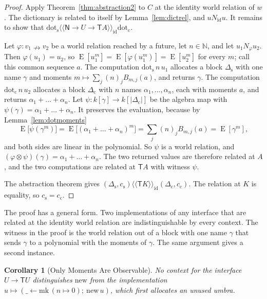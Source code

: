 \documentclass[11pt,a4paper]{report}
\theoremstyle{plain}
\newtheorem{corollary}[theorem]{Corollary}
\theoremstyle{definition}
\theoremstyle{remark}
\newcommand{\E}{\operatorname{E}}
\newcommand{\NN}{\mathbb{N}}
\newcommand{\T}{\mathsf{T}}
\newcommand{\Nat}{\mathsf{N}}
\newcommand{\mk}{\mathrm{mk}}
\newcommand{\rel}[2]{\langle\!\langle #1 \rangle\!\rangle_{#2}}
\begin{document}
\begin{proof}
Apply Theorem~\ref{thm:abstraction2} to $C$ at the identity world relation of $w$.
The dictionary is related to itself by Lemma~\ref{lem:dictrel}, and
$u \mathrel{N_{\mathrm{id}}} u$. It remains to show that
$\mathrm{dot}_{\mathrm{s}} \mathrel{\rel{\Nat \to U \to \T A}{\mathrm{id}}}
\mathrm{dot}_{\mathrm{c}}$.

Let $\varphi : v_1 \nrightarrow v_2$ be a world relation reached by a future, let
$n \in \NN$, and let $u_1 \mathrel{N_\varphi} u_2$. Then $\varphi(u_1) = u_2$, so
$\E[u_1^m] = \E[\varphi(u_1^m)] = \E[u_2^m]$ for every $m$; call this common
sequence $a$. The computation $\mathrm{dot}_{\mathrm{s}}\, n\, u_1$ allocates a
block $\Delta_{\mathrm{s}}$ with one name $\gamma$ and moments
$m \mapsto \sum_j (n)_j B_{m,j}(a)$, and returns $\gamma$. The computation
$\mathrm{dot}_{\mathrm{c}}\, n\, u_2$ allocates a block $\Delta_{\mathrm{c}}$
with $n$ names $\alpha_1, \dots, \alpha_n$, each with moments $a$, and returns
$\alpha_1 + \dots + \alpha_n$. Let $\psi : k[\gamma] \to k[|\Delta_{\mathrm{c}}|]$
be the algebra map with $\psi(\gamma) = \alpha_1 + \dots + \alpha_n$. It
preserves the evaluation, because by Lemma~\ref{lem:dotmoments}
\[
  \E\bigl[\psi(\gamma^m)\bigr] = \E\bigl[(\alpha_1 + \dots + \alpha_n)^m\bigr]
    = \sum_j (n)_j B_{m,j}(a) = \E[\gamma^m] ,
\]
and both sides are linear in the polynomial. So $\psi$ is a world relation, and
$(\varphi \otimes \psi)(\gamma) = \alpha_1 + \dots + \alpha_n$. The two returned
values are therefore related at $A$, and the two computations are related at
$\T A$ with witness $\psi$.

The abstraction theorem gives
$(\Delta_{\mathrm{s}}, c_{\mathrm{s}}) \mathrel{\rel{\T K}{\mathrm{id}}}
(\Delta_{\mathrm{c}}, c_{\mathrm{c}})$. The relation at $K$ is equality, so
$c_{\mathrm{s}} = c_{\mathrm{c}}$.
\end{proof}

The proof has a general form. Two implementations of any interface that are
related at the identity world relation are indistinguishable by every context. The
witness in the proof is the world relation out of a block with one name $\gamma$
that sends $\gamma$ to a polynomial with the moments of $\gamma$. The same
argument gives a second instance.

\begin{corollary}[Only Moments Are Observable]
\label{cor:repind-new}
No context for the interface $U \to \T U$ distinguishes $\mathrm{new}$ from the
implementation $u \mapsto (\_ \leftarrow \mk\,(n \mapsto 0);\ \mathrm{new}\,u)$,
which first allocates an unused umbra.
\end{corollary}
\end{document}
